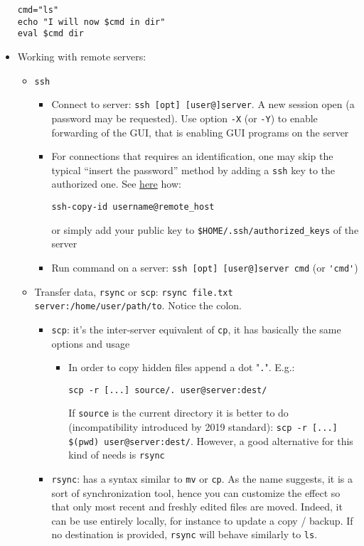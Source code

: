\documentclass[a4paper,12pt,%
              final%
              ]{article}
\begin{document}
\begin{itemize}
\begin{verbatim}
cmd="ls"
echo "I will now $cmd in dir"
eval $cmd dir
\end{verbatim}
  \item Working with remote servers:
    \begin{itemize}
      \item \texttt{ssh}
        \begin{itemize}
          \item Connect to server: \verb|ssh [opt] [user@]server|. A new session open (a password may be requested). Use option \verb|-X| (or \verb|-Y|) to enable forwarding of the GUI, that is enabling GUI programs on the server
          \item For connections that requires an identification, one may skip the typical ``insert the password'' method by adding a \texttt{ssh} key to the authorized one. See \href{https://www.digitalocean.com/community/tutorials/how-to-configure-ssh-key-based-authentication-on-a-linux-server}{here} how:
\begin{verbatim}
ssh-copy-id username@remote_host
\end{verbatim}
            or simply add your public key to \verb|$HOME/.ssh/authorized_keys| of the server
          \item Run command on a server: \verb|ssh [opt] [user@]server cmd| (or \verb|'cmd'|)
        \end{itemize}
      \item Transfer data, \texttt{rsync} or \texttt{scp}: \verb|rsync file.txt server:/home/user/path/to|. Notice the colon.
        \begin{itemize}
          \item \texttt{scp}: it's the inter-server equivalent of \texttt{cp}, it has basically the same options and usage
            \begin{itemize}
              \item In order to copy hidden files append a dot "\texttt{.}". E.g.:
\begin{verbatim}
scp -r [...] source/. user@server:dest/
\end{verbatim}
                If \texttt{source} is the current directory it is better to do (incompatibility introduced by 2019 standard): \verb|scp -r [...] $(pwd) user@server:dest/|. However, a good alternative for this kind of needs is \verb|rsync|
            \end{itemize}
          \item \texttt{rsync}: has a syntax similar to \texttt{mv} or \texttt{cp}. As the name suggests, it is a sort of synchronization tool, hence you can customize the effect so that only most recent and freshly edited files are moved. Indeed, it can be use entirely locally, for instance to update a copy / backup. If no destination is provided, \texttt{rsync} will behave similarly to \texttt{ls}.

\end{itemize}
\end{itemize}
\end{itemize}
\end{document}
